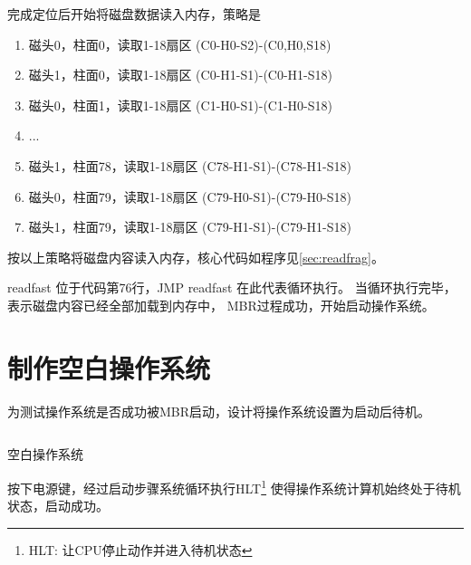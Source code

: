 完成定位后开始将磁盘数据读入内存，策略是
\begin{enumerate}
\item 磁头0，柱面0，读取1-18扇区 (C0-H0-S2)-(C0,H0,S18)
\item 磁头1，柱面0，读取1-18扇区 (C0-H1-S1)-(C0-H1-S18)
\item 磁头0，柱面1，读取1-18扇区 (C1-H0-S1)-(C1-H0-S18)
\item ...
\item 磁头1，柱面78，读取1-18扇区 (C78-H1-S1)-(C78-H1-S18)
\item 磁头0，柱面79，读取1-18扇区 (C79-H0-S1)-(C79-H0-S18)
\item 磁头1，柱面79，读取1-18扇区 (C79-H1-S1)-(C79-H1-S18)
\end{enumerate}

按以上策略将磁盘内容读入内存，核心代码如程序见\ref{sec:readfrag}。

readfast 位于代码第76行，JMP readfast 在此代表循环执行。
当循环执行完毕，表示磁盘内容已经全部加载到内存中，
MBR过程成功，开始启动操作系统。

\section{制作空白操作系统}

为测试操作系统是否成功被MBR启动，设计将操作系统设置为启动后待机。


\begin{listing}[H]
  \inputminted[tabsize=2, firstline=1,
  linenos=true]{c}{fig/blankos.c}
  \caption{空白操作系统}
  \label{lst:blankos}
\end{listing}

按下电源键，经过启动步骤系统循环执行HLT\footnote{HLT: 让CPU停止动作并进入待机状态\cite{30_osKawaiHidemi200630}}
使得操作系统计算机始终处于待机状态，启动成功。